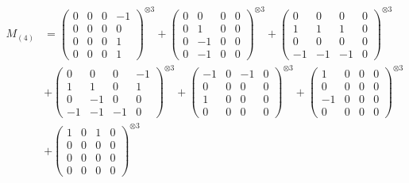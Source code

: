 \documentclass{article}
\newcommand{\Mthree}{%
    M_{(4)}
}
\begin{document}
        \newpage
        
        \footnotesize{
        \begin{align}
        \Mthree
        &= \label{Rs16-Rc11-Solution-13-c1} \begin{pmatrix} 0 & 0 & 0 & -1 \\ 0 & 0 & 0 & 0 \\ 0 & 0 & 0 & 1 \\ 0 & 0 & 0 & 1 \end{pmatrix}^{\otimes 3} 
            + \begin{pmatrix} 0 & 0 & 0 & 0 \\ 0 & 1 & 0 & 0 \\ 0 & -1 & 0 & 0 \\ 0 & -1 & 0 & 0 \end{pmatrix}^{\otimes 3} 
            + \begin{pmatrix} 0 & 0 & 0 & 0 \\ 1 & 1 & 1 & 0 \\ 0 & 0 & 0 & 0 \\ -1 & -1 & -1 & 0 \end{pmatrix}^{\otimes 3} \\
        &+ \label{Rs16-Rc11-Solution-13-c4} \begin{pmatrix} 0 & 0 & 0 & -1 \\ 1 & 1 & 0 & 1 \\ 0 & -1 & 0 & 0 \\ -1 & -1 & -1 & 0 \end{pmatrix}^{\otimes 3} 
            + \begin{pmatrix} -1 & 0 & -1 & 0 \\ 0 & 0 & 0 & 0 \\ 1 & 0 & 0 & 0 \\ 0 & 0 & 0 & 0 \end{pmatrix}^{\otimes 3} 
            + \begin{pmatrix} 1 & 0 & 0 & 0 \\ 0 & 0 & 0 & 0 \\ -1 & 0 & 0 & 0 \\ 0 & 0 & 0 & 0 \end{pmatrix}^{\otimes 3} \\
        &+ \label{Rs16-Rc11-Solution-13-c7} \begin{pmatrix} 1 & 0 & 1 & 0 \\ 0 & 0 & 0 & 0 \\ 0 & 0 & 0 & 0 \\ 0 & 0 & 0 & 0 \end{pmatrix}^{\otimes 3} 

\end{align}}
\end{document}
